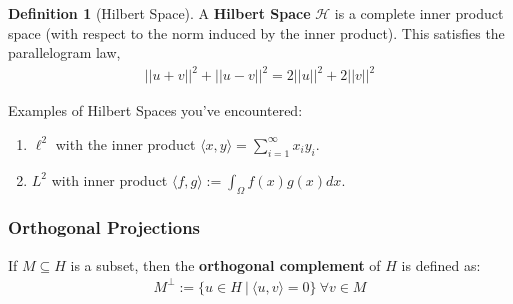 \documentclass[psamsfonts]{amsart}
\theoremstyle{definition}
\newtheorem{defn}[thm]{Definition}
\theoremstyle{remark}
\numberwithin{equation}{section}
\begin{document}
\begin{defn}[Hilbert Space]
	A \textbf{Hilbert Space} \( \mathcal{H} \) is a complete inner product space (with respect to the norm induced by the inner product). This satisfies the parallelogram law, 
	\begin{align*}
		\boxed{||u+v||^2 + ||u-v||^2 = 2 ||u||^2 + 2 ||v||^2}
	\end{align*}
\end{defn}
Examples of Hilbert Spaces you've encountered:
\begin{enumerate}
	\item \( \ell^2 \) with the inner product \( \langle x, y \rangle = \sum_{i=1}^\infty x_i y_i \). 
	\item \( L^2 \) with inner product \( \langle f, g \rangle := \int_\Omega f(x) g(x) dx \).
\end{enumerate}

\subsubsection{Orthogonal Projections}
If \( M \subseteq H \) is a subset, then the \textbf{orthogonal  complement} of \( H \) is defined as:
\begin{align*}
	\boxed{M^{\perp} := \{ u \in H\ |\ \langle u, v \rangle = 0\}\ \forall v \in M }
\end{align*}
\end{document}
